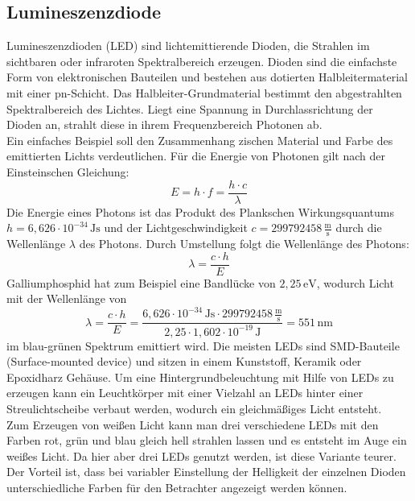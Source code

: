 \subsection{Lumineszenzdiode}
Lumineszenzdioden (LED) sind lichtemittierende Dioden, die Strahlen im sichtbaren oder infraroten Spektralbereich erzeugen. Dioden sind die einfachste Form von elektronischen Bauteilen und bestehen aus dotierten Halbleitermaterial mit einer pn-Schicht. Das Halbleiter-Grundmaterial bestimmt den abgestrahlten Spektralbereich des Lichtes. Liegt eine Spannung in Durchlassrichtung der Dioden an, strahlt diese in ihrem Frequenzbereich Photonen ab. \cite[Vgl. Seite 193 f.]{LofflerMang.2020} \\
Ein einfaches Beispiel soll den Zusammenhang zischen Material und Farbe des emittierten Lichts verdeutlichen. Für die Energie von Photonen gilt nach der Einstein\grq schen Gleichung:
\begin{equation}
	E = h \cdot f = \frac{h \cdot c}{\lambda}
\end{equation}
Die Energie eines Photons ist das Produkt des Plank\grq schen Wirkungsquantums $ h = 6,626 \cdot 10^{-34}\, \mathrm{Js} $ und der Lichtgeschwindigkeit $ c = 299792458\, \frac{\mathrm{m}}{\mathrm{s}}$ durch die Wellenlänge $ \lambda $ des Photons.
Durch Umstellung folgt die Wellenlänge des Photons:
\begin{equation}
	\lambda = \frac{c \cdot h}{E}
\end{equation}
Galliumphosphid hat zum Beispiel eine Bandlücke von $ 2,25\,\mathrm{eV} $, wodurch Licht mit der Wellenlänge von
\begin{equation}
	\lambda = \frac{c \cdot h}{E} = \frac{6,626 \cdot 10^{-34}\,\mathrm{Js} \cdot 299792458\,\frac{\mathrm{m}}{\mathrm{s}}}{2,25 \cdot 1,602 \cdot 10^{-19}\, \mathrm{J}} = 551\,\mathrm{nm}
\end{equation}
im blau-grünen Spektrum emittiert wird.
Die meisten LEDs sind SMD-Bauteile (Surface-mounted device) und sitzen in einem Kunststoff, Keramik oder Epoxidharz Gehäuse. 
Um eine Hintergrundbeleuchtung mit Hilfe von LEDs zu erzeugen kann ein Leuchtkörper mit einer Vielzahl an LEDs hinter einer Streulichtscheibe verbaut werden, wodurch ein gleichmäßiges Licht entsteht. \cite[Vgl. Seite 194]{LofflerMang.2020} \\
Zum Erzeugen von weißen Licht kann man drei verschiedene LEDs mit den Farben rot, grün und blau gleich hell strahlen lassen und es entsteht im Auge ein weißes Licht. Da hier aber drei LEDs genutzt werden, ist diese Variante teurer. Der Vorteil ist, dass bei variabler Einstellung der Helligkeit der einzelnen Dioden unterschiedliche Farben für den Betrachter angezeigt werden können. \\ 
